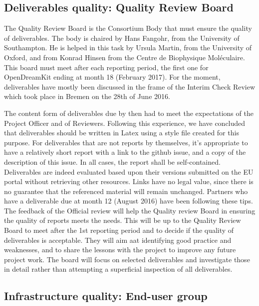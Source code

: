 \documentclass{../../Proposal/LaTeX-proposal/deliverablereport}
\begin{document}
\subsection{Deliverables quality: Quality Review Board}

The Quality Review Board is the Consortium Body that must ensure the quality of deliverables.
The body is chaired by Hans Fangohr, from the University of Southampton. He is helped in this task by Ursula Martin, from the University of Oxford, and from Konrad Hinsen from the Centre de Biophysique Moléculaire. This board must meet after each reporting period, the first one for OpenDreamKit ending at month 18 (February 2017). 
For the moment, deliverables have mostly been discussed in the frame of the Interim Check Review which took place in Bremen on the 28th of June 2016.

The content form of deliverables due by then had to meet the expectations of the Project Officer and of Reviewers. Following this experience, we have concluded that deliverables should be written in Latex using a style file created for this purpose. For deliverables that are not reports by themselves, it's appropriate to have a relatively short report with a link to the github issue, and a copy of the description of this issue. In all cases, the report shall be self-contained. Deliverables are indeed evaluated based upon their versions submitted on the EU portal without retrieving other resources. Links have no legal value, since there is no guarantee that the referenced material will remain unchanged.
Partners who have a deliverable due at month 12 (August 2016) have been following these tips. The feedback of the Official review will help the Quality review Board in ensuring the quality of reports meets the needs. This will be up to the Quality Review Board to meet after the 1st reporting period and to decide if the quality of deliverables is acceptable.
They will aim aat identifying good practice and weaknesses, and to share the lessons with the project to improve any future project work. The board will focus on selected deliverables and investigate those in detail rather than attempting a superficial inspection of all deliverables.


\subsection{Infrastructure quality: End-user group}
\end{document}
